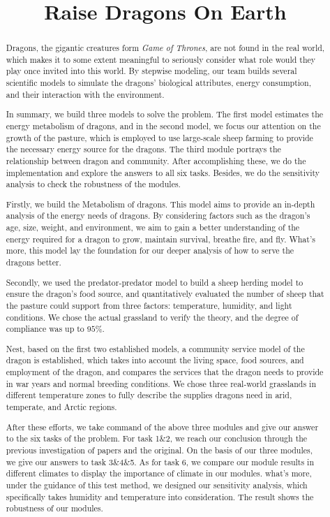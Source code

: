 \documentclass[12pt]{article}  %
\title{Raise Dragons On Earth}  %
\begin{document}
\begin{abstract}
Dragons, the gigantic creatures form \textit{Game of Thrones}, are not found in the real world, which makes it to some extent meaningful to seriously consider what role would they play once invited into this world. By stepwise modeling, our team builds several scientific models to simulate the dragons' biological attributes, energy consumption, and their interaction with the environment.

In summary, we build three models to solve the problem. The first model estimates the energy metabolism of dragons, and in the second model, we focus our attention on the growth of the pasture, which is employed to use large-scale sheep farming to provide the necessary energy source for the dragons. The third module portrays the relationship between dragon and community. After accomplishing these, we do the implementation and explore the answers to all six tasks. Besides, we do the sensitivity analysis to check the robustness of the modules.

Firstly, we build the Metabolism of dragons. This model aims to provide an in-depth analysis of the energy needs of dragons. By considering factors such as the dragon's age, size, weight, and environment, we aim to gain a better understanding of the energy required for a dragon to grow, maintain survival, breathe fire, and fly. What's more, this model lay the foundation for our deeper analysis of how to serve the dragons better.

Secondly, we used the predator-predator model to build a sheep herding model to ensure the dragon's food source, and quantitatively evaluated the number of sheep that the pasture could support from three factors: temperature, humidity, and light conditions. We chose the actual grassland to verify the theory, and the degree of compliance was up to $95\%$. 

Nest, based on the first two established models, a community service model of the dragon is established, which takes into account the living space, food sources, and employment of the dragon, and compares the services that the dragon needs to provide in war years and normal breeding conditions. We chose three real-world grasslands in different temperature zones to fully describe the supplies dragons need in arid, temperate, and Arctic regions. 

After these efforts, we take command of the above three modules and give our answer to the six tasks of the problem. For task 1\&2, we reach our conclusion through the previous investigation of papers and the original. On the basis of our three modules, we give our answers to task 3\&4\&5. As for task 6, we compare our module results in different climates to display the importance of climate in our modules. what's more, under the guidance of this test method, we designed our sensitivity analysis, which specifically takes humidity and temperature into consideration. The result shows the robustness of our modules.


\end{abstract}
\end{document}
